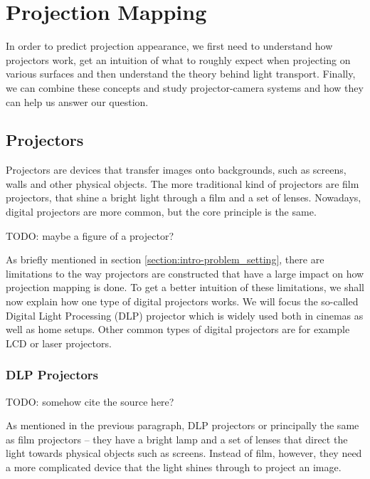 \section{Projection Mapping}
\label{section:background-projection_mapping}

In order to predict projection appearance, we first need to understand how projectors work, get an intuition of what to roughly expect when projecting on various surfaces and then understand the theory behind light transport. Finally, we can combine these concepts and study projector-camera systems and how they can help us answer our question.

\subsection{Projectors}
\label{section:background-projection_mapping-projectors}

Projectors are devices that transfer images onto backgrounds, such as screens, walls and other physical objects. The more traditional kind of projectors are film projectors, that shine a bright light through a film and a set of lenses. Nowadays, digital projectors are more common, but the core principle is the same.

{\color{red} TODO: maybe a figure of a projector?}

As briefly mentioned in section \ref{section:intro-problem_setting}, there are limitations to the way projectors are constructed that have a large impact on how projection mapping is done. To get a better intuition of these limitations, we shall now explain how one type of digital projectors works. We will focus the so-called Digital Light Processing (DLP) projector which is widely used both in cinemas as well as home setups. Other common types of digital projectors are for example LCD or laser projectors.

\subsubsection{DLP Projectors}
\label{section:background-projection_mapping-projectors-DLP}

{\color{red} TODO: somehow cite the source here?}

As mentioned in the previous paragraph, DLP projectors or principally the same as film projectors -- they have a bright lamp and a set of lenses that direct the light towards physical objects such as screens. Instead of film, however, they need a more complicated device that the light shines through to project an image.

